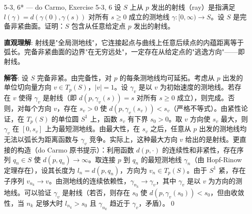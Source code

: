 \begin{exercise}{5-3, 6* — do Carmo, Exercise 5-3, 6}
设 $S$ 上从 $p$ 发出的射线（ray）是指满足 $l(\gamma) = d(\gamma(0),\gamma(s))$ 对所有 $s\geq 0$ 成立的测地线 $\gamma: [0,\infty) \to S$。设 $S$ 是完备非紧曲面。证明：$S$ 包含从任意给定点 $p$ 发出的射线。
\end{exercise}
\begin{solution}
\textbf{直观理解}: 射线是"全局测地线"，它连接起点与曲线上任意后续点的内蕴距离等于弧长。完备非紧曲面的边界"在无穷远处"，一定存在从给定点的"逃逸方向"——即射线。

\textbf{解答}: 设 $S$ 完备非紧。由完备性，对 $p$ 的每条测地线均可延拓。考虑从 $p$ 出发的单位切向量方向 $v \in T_p(S)$，$|v|=1$。设 $\gamma_v$ 是以 $v$ 为初始速度的测地线。若存在 $v$ 使得 $\gamma_v$ 是射线（即 $d(p,\gamma_v(s)) = s$ 对所有 $s\geq 0$ 成立），则完成。否则，对每个方向 $v$，存在 $s_v > 0$ 使 $d(p,\gamma_v(s_v)) < s_v$（严格不等式）。由紧性论证，在 $T_p(S)$ 的单位圆 $S^1$ 上，函数 $s_v$ 有下界 $s_0 > 0$。取 $v$ 方向使 $s_v$ 最大，则 $\gamma_v$ 在 $[0,s_v]$ 上为最短测地线。由最大性，在 $s_v$ 之后，任意从 $p$ 出发的测地线均无法以弧长为距离函数与 $\gamma_v$ 竞争。实际上，这种最大方向 $v$ 给出的是射线。更直接的构造（do Carmo 原书提示）：利用函数 $d(p,\cdot)$ 的连续性和非紧性，存在序列 $q_n \in S$ 使 $d(p,q_n) \to \infty$。取连接 $p$ 到 $q_n$ 的最短测地线 $\gamma_n$（由 Hopf-Rinow 定理存在），设其长度为 $l_n = d(p,q_n)$，方向为 $v_n \in T_p(S)$。由于 $S^1$ 紧，存在子序列 $v_{n_k} \to v$。由测地线的连续依赖性，$\gamma_{n_k} \to \gamma_v$，其中 $\gamma_v$ 是以 $v$ 为方向的测地线。可以验证 $\gamma_v$ 是射线（若否，则存在 $s_0$ 使 $d(p,\gamma_v(s_0)) < s_0$，但由收敛性，当 $n_k$ 足够大时 $l_{n_k} > s_0$ 且 $\gamma_{n_k}$ 趋近于 $\gamma_v$，矛盾）。\qed
\end{solution}

